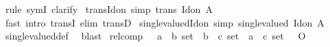 \begin{isabellebody}
\isamarkupfalse%
\ {\isacharparenleft}{\kern0pt}rule\ symI{\isacharparenright}{\kern0pt}\ clarify%
\endisatagproof
{\isafoldproof}%
%
\isadelimproof
\isanewline
%
\endisadelimproof
\isanewline
{}\isamarkupfalse%
\ trans{\isacharunderscore}{\kern0pt}Id{\isacharunderscore}{\kern0pt}on\ {\isacharbrackleft}{\kern0pt}simp{\isacharbrackright}{\kern0pt}{\isacharcolon}{\kern0pt}\ {\isachardoublequoteopen}trans\ {\isacharparenleft}{\kern0pt}Id{\isacharunderscore}{\kern0pt}on\ A{\isacharparenright}{\kern0pt}{\isachardoublequoteclose}\isanewline
%
\isadelimproof
\ \ %
\endisadelimproof
%
\isatagproof
{}\isamarkupfalse%
\ {\isacharparenleft}{\kern0pt}fast\ intro{\isacharcolon}{\kern0pt}\ transI\ elim{\isacharcolon}{\kern0pt}\ transD{\isacharparenright}{\kern0pt}%
\endisatagproof
{\isafoldproof}%
%
\isadelimproof
\isanewline
%
\endisadelimproof
\isanewline
{}\isamarkupfalse%
\ single{\isacharunderscore}{\kern0pt}valued{\isacharunderscore}{\kern0pt}Id{\isacharunderscore}{\kern0pt}on\ {\isacharbrackleft}{\kern0pt}simp{\isacharbrackright}{\kern0pt}{\isacharcolon}{\kern0pt}\ {\isachardoublequoteopen}single{\isacharunderscore}{\kern0pt}valued\ {\isacharparenleft}{\kern0pt}Id{\isacharunderscore}{\kern0pt}on\ A{\isacharparenright}{\kern0pt}{\isachardoublequoteclose}\isanewline
%
\isadelimproof
\ \ %
\endisadelimproof
%
\isatagproof
{}\isamarkupfalse%
\ single{\isacharunderscore}{\kern0pt}valued{\isacharunderscore}{\kern0pt}def\ \isamarkupfalse%
\ blast%
\endisatagproof
{\isafoldproof}%
%
\isadelimproof
%
\endisadelimproof
%
\isadelimdocument
%
\endisadelimdocument
%
\isatagdocument
%
\isamarkuptrue%
%
\endisatagdocument
{\isafolddocument}%
%
\isadelimdocument
%
\endisadelimdocument
{}\isamarkupfalse%
\ relcomp\ \ {\isacharcolon}{\kern0pt}{\isacharcolon}{\kern0pt}\ {\isachardoublequoteopen}{\isacharparenleft}{\kern0pt}{\isacharprime}{\kern0pt}a\ {\isasymtimes}\ {\isacharprime}{\kern0pt}b{\isacharparenright}{\kern0pt}\ set\ {\isasymRightarrow}\ {\isacharparenleft}{\kern0pt}{\isacharprime}{\kern0pt}b\ {\isasymtimes}\ {\isacharprime}{\kern0pt}c{\isacharparenright}{\kern0pt}\ set\ {\isasymRightarrow}\ {\isacharparenleft}{\kern0pt}{\isacharprime}{\kern0pt}a\ {\isasymtimes}\ {\isacharprime}{\kern0pt}c{\isacharparenright}{\kern0pt}\ set{\isachardoublequoteclose}\ \ {\isacharparenleft}{\kern0pt}\ {\isachardoublequoteopen}O{\isachardoublequoteclose}\ {}{}{\isacharparenright}{\kern0pt}\isanewline

\end{isabellebody}
